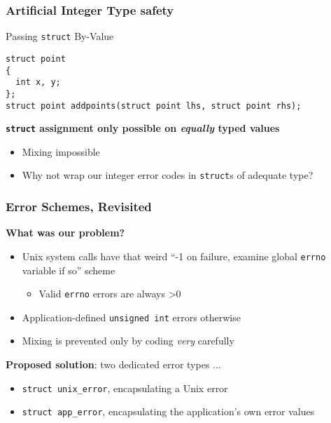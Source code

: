 \begin{frame}[fragile]
  \frametitle{Artificial Integer Type safety}

  \begin{block}{Passing \texttt{struct} By-Value}
\begin{verbatim}
struct point
{
  int x, y;
};
struct point addpoints(struct point lhs, struct point rhs);
\end{verbatim}
  \end{block}

  \textbf{\texttt{struct} assignment only possible on \textit{equally}
    typed values}

  \begin{itemize}
  \item Mixing impossible
  \item Why not wrap our integer error codes in \texttt{struct}s of
    adequate type?
  \end{itemize}

\end{frame}

\begin{frame}
  \frametitle{Error Schemes, Revisited}

  \textbf{What was our problem?}

  \begin{itemize}
  \item Unix system calls have that weird ``-1 on failure, examine
    global \texttt{errno} variable if so'' scheme
    \begin{itemize}
    \item Valid \texttt{errno} errors are always \textgreater 0
    \end{itemize}
  \item Application-defined \texttt{unsigned int} errors otherwise
  \item Mixing is prevented only by coding \textit{very} carefully
  \end{itemize}

  \textbf{Proposed solution}: two dedicated error types ...

  \begin{itemize}
  \item \texttt{struct unix\_error}, encapsulating a Unix error
  \item \texttt{struct app\_error}, encapsulating the application's
    own error values
  \end{itemize}

\end{frame}

